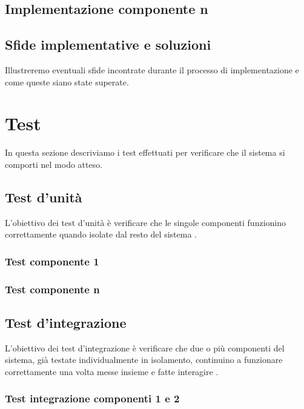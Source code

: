 \subsection{Implementazione componente n}

\subsection{Sfide implementative e soluzioni}

Illustreremo eventuali sfide incontrate durante il processo di implementazione e come queste siano state superate.

\section{Test}

In questa sezione descriviamo i test effettuati per verificare che il sistema si comporti nel modo atteso.

\subsection{Test d'unit\`a}

L'obiettivo dei test d'unità è verificare che le singole componenti funzionino correttamente quando isolate dal resto del sistema \cite{bettini2021tdd}.

\subsubsection{Test componente 1}

\subsubsection{Test componente n}

\subsection{Test d'integrazione}

L'obiettivo dei test d'integrazione è verificare che due o più componenti del sistema, già testate individualmente in isolamento, continuino a funzionare correttamente una volta messe insieme e fatte interagire \cite{bettini2021tdd}.

\subsubsection{Test integrazione componenti 1 e 2}

